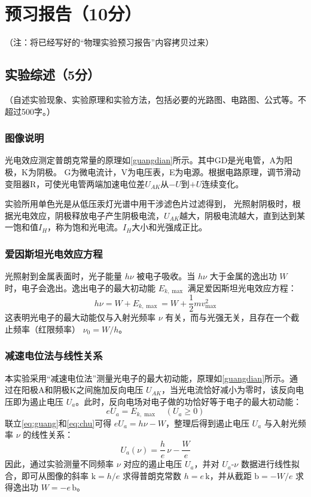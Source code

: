 \documentclass{../../templates/Report}%
\begin{document}
\maketitle%

\section{预习报告（10分）}
（注：将已经写好的“物理实验预习报告”内容拷贝过来）

\subsection{实验综述（5分）}
（自述实验现象、实验原理和实验方法，包括必要的光路图、电路图、公式等。不超过500字。）

\subsubsection{图像说明}
光电效应测定普朗克常量的原理如\cref{guangdian}所示。其中GD是光电管，A为阳极，K为阴极。
G为微电流计，V为电压表，E为电源。根据电路原理，调节滑动变阻器R，可使光电管两端加速电位差$U_{AK}$从$-U$到$+U$连续变化。

实验所用单色光是从低压汞灯光谱中用干涉滤色片过滤得到，
光照射阴极时，根据光电效应，阴极释放电子产生阴极电流，$U_{AK}$越大，阴极电流越大，直到达到某一饱和值$I_H$，称为饱和光电流。$I_H$大小和光强成正比。
\subsubsection{爱因斯坦光电效应方程}
光照射到金属表面时，光子能量 $h\nu$ 被电子吸收。当 $h\nu$ 大于金属的逸出功 $W$ 时，电子会逸出。逸出电子的最大初动能 $E_{k,\max}$ 满足爱因斯坦光电效应方程：
\begin{equation}
    h\nu = W + E_{k,\max} = W + \frac{1}{2}mv^2_{\max} \label{eq:guang}
\end{equation}
这表明光电子的最大动能仅与入射光频率 $\nu$ 有关，而与光强无关，且存在一个截止频率（红限频率） $\nu_0 = W/h$。

\subsubsection{减速电位法与线性关系}
本实验采用“减速电位法”测量光电子的最大初动能，原理如\cref{guangdian}所示。通过在阳极A和阴极K之间施加反向电压 $U_{AK}$，当光电流恰好减小为零时，该反向电压即为遏止电压 $U_a$。此时，反向电场对电子做的功恰好等于电子的最大初动能：
\begin{equation}
    eU_a = E_{k,\max} \quad (U_a \ge 0) \label{eq:chu}
\end{equation}
联立\cref{eq:guang}和\cref{eq:chu}可得 $eU_a = h\nu - W$，整理后得到遏止电压 $U_a$ 与入射光频率 $\nu$ 的线性关系：
\begin{equation}
    U_a(\nu) = \frac{h}{e}\,\nu - \frac{W}{e}
\end{equation}
因此，通过实验测量不同频率 $\nu$ 对应的遏止电压 $U_a$，并对 $U_a$-$\nu$ 数据进行线性拟合，即可从图像的斜率 $\mathrm{k}=h/e$ 求得普朗克常数 $h=e\,\mathrm{k}$，并从截距 $\mathrm{b}=-W/e$ 求得逸出功 $W=-e\,\mathrm{b}$。
\end{document}
